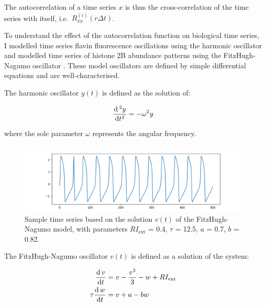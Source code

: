 The autocorrelation of a time series $x$ is thus the cross-correlation of the time series with itself, i.e.\ $R_{xx}^{(i)}(r \Delta t)$.


To understand the effect of the autocorrelation function on biological time series, I modelled time series flavin fluorescence oscillations using the harmonic oscillator and modelled time series of histone 2B abundance patterns using the FitzHugh-Nagumo oscillator \parencite{fitzhughImpulsesPhysiologicalStates1961}.
These model oscillators are defined by simple differential equations and are well-characterised.

The harmonic oscillator $y(t)$ is defined as the solution of:

\begin{equation}
  \frac{\mathrm{d} \,^{2} y}{\mathrm{d} t^{2}} = -\omega^{2}y
  \label{eq:harmonic}
\end{equation}

where the sole parameter $\omega$ represents the angular frequency.


\begin{figure}
  \centering
  \includegraphics[width=0.9\linewidth]{fitzhughnagumo_sample.png}
  \caption[
    Sample time series based on the solution of the FitzHugh-Nagumo model
  ]
  {
    Sample time series based on the solution $v(t)$ of the FitzHugh-Nagumo model, with parameters
    $RI_{\mathrm{ext}}$ = 0.4, $\tau$ = 12.5, $a$ = 0.7, $b$ = 0.82.
  }
  \label{fig:fitzhughnagumo_sample}
\end{figure}

The FitzHugh-Nagumo oscillator $v(t)$ is defined as a solution of the system:

\begin{equation}
  \begin{aligned}
    \frac{\mathrm{d} \, v}{\mathrm{d} t} &= v - \frac{v^3}{3} - w + RI_{\mathrm{ext}} \\
    \tau \frac{\mathrm{d} \, w}{\mathrm{d} t} &= v + a - bw
  \end{aligned}
  \label{eq:fhn}
\end{equation}

